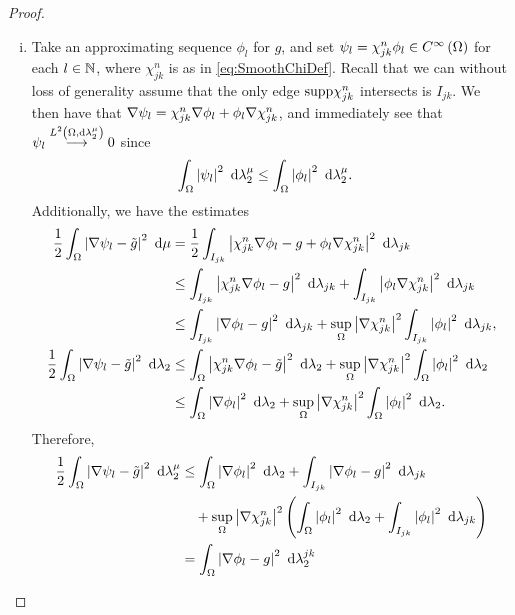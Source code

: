 \begin{proof}
	\begin{enumerate}[(i)]
		\item Take an approximating sequence $\phi_l$ for $g$, and set $\psi_l = \chi_{jk}^n\phi_l\in C^{\infty}\left( \Omega \right)$ for each $l\in\mathbb{N}$, where $\chi_{jk}^n$ is as in \eqref{eq:SmoothChiDef}.
		Recall that we can without loss of generality assume that the only edge $\mathrm{supp}\chi_{jk}^n$ intersects is $I_{jk}$.
		We then have that $\nabla\psi_l = \chi_{jk}^n\nabla\phi_l + \phi_l\nabla\chi_{jk}^n$, and immediately see that $\psi_l\overset{L^{2}\left( \Omega,\mathrm{d} \lambda_2^{\mu} \right)}{\longrightarrow}0$ since
		\begin{align*}
			\int_{\Omega}\left\lvert  \psi_l  \right\rvert^2 \ \mathrm{d}\lambda_2^{\mu}
			&\leq \int_{\Omega}\left\lvert  \phi_l  \right\rvert^2 \ \mathrm{d}\lambda_2^{\mu}.
		\end{align*}
		Additionally, we have the estimates
		\begin{align*}
			\frac{1}{2}\int_{\Omega}\left\lvert  \nabla\psi_l - \tilde{g}  \right\rvert^2 \ \mathrm{d}\mu
			&= \frac{1}{2}\int_{I_{jk}}\left\lvert  \chi_{jk}^n\nabla\phi_l - g  + \phi_l\nabla\chi_{jk}^n  \right\rvert^2 \ \mathrm{d}\lambda_{jk} \\
			&\leq \int_{I_{jk}}\left\lvert  \chi_{jk}^n\nabla\phi_l - g  \right\rvert^2 \ \mathrm{d}\lambda_{jk}
			+ \int_{I_{jk}}\left\lvert  \phi_l\nabla\chi_{jk}^n  \right\rvert^2 \ \mathrm{d}\lambda_{jk} \\
			&\leq \int_{I_{jk}}\left\lvert  \nabla\phi_l - g  \right\rvert^2 \ \mathrm{d}\lambda_{jk}
			+ \sup_{\Omega}\left\lvert \nabla\chi_{jk}^n \right\rvert^2 \int_{I_{jk}}\left\lvert  \phi_l  \right\rvert^2 \ \mathrm{d}\lambda_{jk}, \\
			\frac{1}{2}\int_{\Omega}\left\lvert  \nabla\psi_l - \tilde{g}  \right\rvert^2 \ \mathrm{d}\lambda_2
			&\leq \int_{\Omega}\left\lvert  \chi_{jk}^n\nabla\phi_l - \tilde{g}  \right\rvert^2 \ \mathrm{d}\lambda_2
			+ \sup_{\Omega}\left\lvert \nabla\chi_{jk}^n \right\rvert^2 \int_{\Omega}\left\lvert  \phi_l  \right\rvert^2 \ \mathrm{d}\lambda_2 \\
			&\leq \int_{\Omega}\left\lvert  \nabla\phi_l  \right\rvert^2 \ \mathrm{d}\lambda_2
			+ \sup_{\Omega}\left\lvert \nabla\chi_{jk}^n \right\rvert^2 \int_{\Omega}\left\lvert  \phi_l  \right\rvert^2 \ \mathrm{d}\lambda_2.
		\end{align*}
		Therefore,
		\begin{align*}
			\recip{2}\integral{\ddom}{\abs{ \grad\psi_l - \tilde{g} }^2}{\compMes}
			&\leq \integral{\ddom}{\abs{ \grad\phi_l }^2}{\lambda_2}
			+ \integral{I_{jk}}{\abs{ \grad\phi_l - g }^2}{\lambda_{jk}} \\
			&\quad + \sup_{\ddom}\abs{\grad\chi_{jk}^n}^2 
			\bracs{ \integral{\ddom}{\abs{ \phi_l }^2}{\lambda_2} 	+ \integral{I_{jk}}{\abs{ \phi_l }^2}{\lambda_{jk}} } \\
			&= \integral{\ddom}{\abs{ \grad\phi_l - g }^2}{\lcompMes}

\end{align*}
\end{enumerate}
\end{proof}
